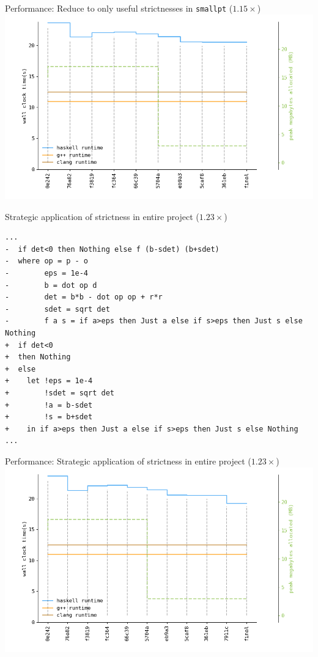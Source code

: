 \documentclass[8pt]{beamer}
\begin{document}
\begin{frame}[fragile]{Performance: Reduce to only useful strictnesses in \texttt{smallpt}  ($1.15\times$)}
\includegraphics[height=0.6\textwidth]{perfdata-upto-361eb-gen.png}
\end{frame}

\begin{frame}[fragile]{Strategic application of strictness in entire project ($1.23\times$)}
\begin{verbatim}
...
-  if det<0 then Nothing else f (b-sdet) (b+sdet)
-  where op = p - o
-        eps = 1e-4
-        b = dot op d
-        det = b*b - dot op op + r*r
-        sdet = sqrt det
-        f a s = if a>eps then Just a else if s>eps then Just s else Nothing
+  if det<0
+  then Nothing
+  else
+    let !eps = 1e-4
+        !sdet = sqrt det
+        !a = b-sdet
+        !s = b+sdet
+    in if a>eps then Just a else if s>eps then Just s else Nothing
...
\end{verbatim}


\end{frame}

\begin{frame}[fragile]{Performance: Strategic application of strictness in entire project ($1.23\times$)}
\includegraphics[height=0.6\textwidth]{perfdata-upto-7911c-gen.png}
\end{frame}
\end{document}
